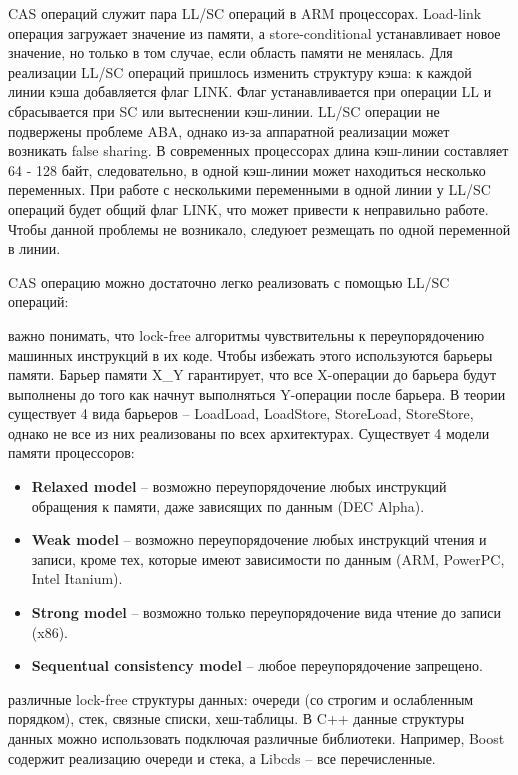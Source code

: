 {	 CAS операций служит пара LL/SC операций в ARM процессорах. Load-link операция загружает значение из памяти, а store-conditional устанавливает новое значение, но только в том случае, если область памяти не менялась. Для реализации LL/SC операций пришлось изменить структуру кэша: к каждой линии кэша добавляется флаг LINK. Флаг устанавливается при операции LL и сбрасывается при SC или вытеснении кэш-линии. LL/SC операции не подвержены проблеме ABA, однако из-за аппаратной реализации может возникать false sharing. В современных процессорах длина кэш-линии составляет 64 - 128 байт, следовательно, в одной кэш-линии может находиться несколько переменных. При работе с несколькими переменными в одной линии у LL/SC операций будет общий флаг LINK, что может привести к неправильно работе. Чтобы данной проблемы не возникало, следуюет резмещать по одной переменной в линии.
	\begin{figure}[H]
		
	\end{figure}
	\par CAS операцию можно достаточно легко реализовать с помощью LL/SC операций:
	\begin{figure}[H]
		
	\end{figure}
	 важно понимать, что lock-free алгоритмы чувствительны к переупорядочению машинных инструкций в их коде. Чтобы избежать этого используются барьеры памяти. Барьер памяти X\_Y гарантирует, что все X-операции до барьера будут выполнены до того как начнут выполняться Y-операции после барьера. В теории существует 4 вида барьеров -- LoadLoad, LoadStore, StoreLoad, StoreStore, однако не все из них реализованы по всех архитектурах. Существует 4 модели памяти процессоров: 
	\begin{itemize}  
		\item\textbf{Relaxed model} -- возможно переупорядочение любых инструкций обращения к памяти, даже зависящих по данным (DEC Alpha).
		\item\textbf{Weak model} -- возможно переупорядочение любых инструкций чтения и записи, кроме тех, которые имеют зависимости по данным (ARM, PowerPC, Intel Itanium).
		\item\textbf{Strong model } -- возможно только переупорядочение вида чтение до записи (x86).
		\item\textbf{Sequentual consistency model} -- любое переупорядочение запрещено.
	\end{itemize}
	 различные lock-free структуры данных: очереди (со строгим и ослабленным порядком), стек, связные списки, хеш-таблицы. В C++ данные структуры данных можно использовать подключая различные библиотеки. Например, Boost содержит реализацию очереди и стека, а Libcds -- все перечисленные.
}
